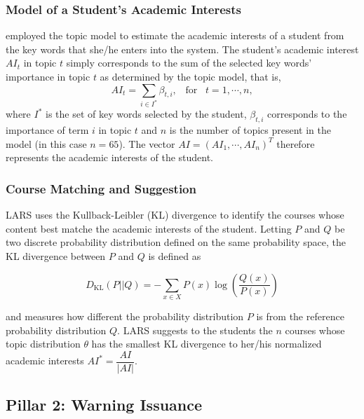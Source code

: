 \documentclass[pmlr]{jmlr}%
\begin{document}
\subsubsection{Model of a Student's Academic Interests}

\citet{Morsomme.2019} employed the topic model to estimate the academic interests of a student from the key words that she/he enters into the system. The student's academic interest $AI_t$ in topic $t$ simply corresponds to the sum of the selected key words' importance in topic $t$ as determined by the topic model, that is,
$$ AI_t = \sum_{i \in I^*} \beta_{t,i}, \;\;\;  \mbox{for} \;\;\;  t=1, \cdots, n,$$
where $I^*$ is the set of key words selected by the student, $\beta_{t,i}$ corresponds to the importance of term $i$ in topic $t$ and $n$ is the number of topics present in the model (in this case $n=65$). The vector $AI = (AI_1, \cdots, AI_{n})^T$ therefore represents the academic interests of the student.

\subsubsection{Course Matching and Suggestion}

LARS uses the Kullback-Leibler (KL) divergence \citep{Kullback.1951} to identify the courses whose content best matche the academic interests of the student.
Letting $P$ and $Q$ be two discrete probability distribution defined on the same probability space, the KL divergence between $P$ and $Q$ is defined as

$$ D_{\mathrm{KL}} \left( P || Q \right) =  - \sum_{x \in X} P(x) \log\left(\dfrac{Q(x)}{P(x)}\right)$$

\noindent and measures how different the probability distribution $P$ is from the reference probability distribution $Q$.
LARS suggests to the students the $n$ courses whose topic distribution $\theta$ has the smallest KL divergence to her/his normalized academic interests $AI^* = \dfrac{AI}{\lvert AI \rvert}$.

\subsection{Pillar 2: Warning Issuance}
\end{document}
